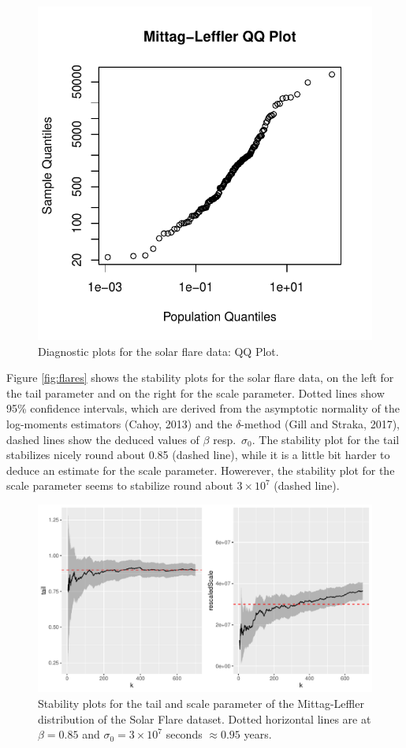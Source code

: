 \documentclass[]{elsarticle} %
\begin{document}
\begin{figure}

{\centering \includegraphics[width=0.7\linewidth]{article_springer_files/figure-latex/flare-diagnostics-3-1} 

}

\caption{\label{fig:flare-diagnostics-3} Diagnostic plots for the solar flare data: QQ Plot.}\label{fig:flare-diagnostics-3}
\end{figure}

Figure \ref{fig:flares} shows the stability plots for the solar flare
data, on the left for the tail parameter and on the right for the scale
parameter. Dotted lines show 95\% confidence intervals, which are
derived from the asymptotic normality of the log-moments estimators
(Cahoy, 2013) and the \(\delta\)-method (Gill and Straka, 2017), dashed
lines show the deduced values of \(\beta\) resp.~\(\sigma_0\). The
stability plot for the tail stabilizes nicely round about 0.85 (dashed
line), while it is a little bit harder to deduce an estimate for the
scale parameter. Howerever, the stability plot for the scale parameter
seems to stabilize round about \(3 \times 10^7\) (dashed line).

\begin{figure}
\includegraphics[width=\textwidth]{article_springer_files/figure-latex/solar-flare-tail-scale-1} \caption{\label{fig:flares} Stability plots for the tail and scale parameter of the Mittag-Leffler distribution of the Solar Flare dataset. Dotted horizontal lines are at $\beta = 0.85$ and $\sigma_0 = 3 \times 10^7$ seconds $\approx 0.95$ years.}\label{fig:solar-flare-tail-scale}
\end{figure}
\end{document}
